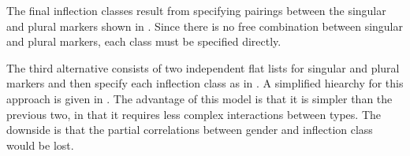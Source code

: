 \begin{figure}
{}
\end{figure}

The final inflection classes result from specifying pairings between the singular and plural markers shown in . Since there is no free combination between singular and plural markers, each class must be specified directly.

\largerpage 
The third alternative consists of two independent flat lists for singular and plural markers and then specify each inflection class as in . A simplified hiearchy for this approach is given in . The advantage of this model is that it is simpler than the previous two, in that it requires less complex interactions between types. The downside is that the partial correlations between gender and inflection class would be lost.

